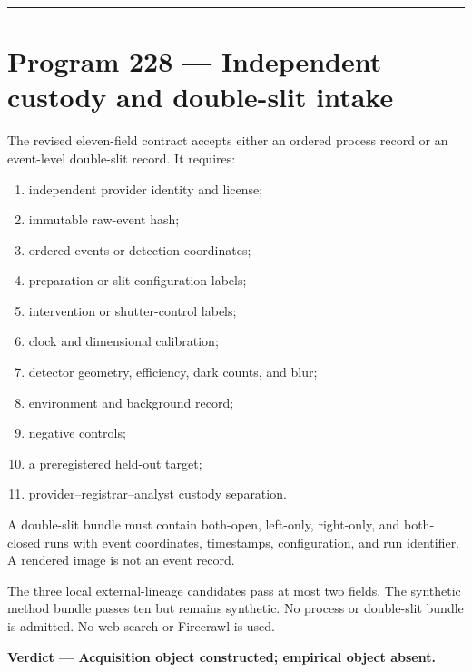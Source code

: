 \documentclass[11pt,a4paper,openany]{report}
\begin{document}
\par\medskip\hrule\medskip

\chapter{Program 228 --- Independent custody and double-slit intake}

The revised eleven-field contract accepts either an ordered process record or an event-level double-slit record. It requires:

\begin{enumerate}
\item 
independent provider identity and license;

\item 
immutable raw-event hash;

\item 
ordered events or detection coordinates;

\item 
preparation or slit-configuration labels;

\item 
intervention or shutter-control labels;

\item 
clock and dimensional calibration;

\item 
detector geometry, efficiency, dark counts, and blur;

\item 
environment and background record;

\item 
negative controls;

\item 
a preregistered held-out target;

\item 
provider--registrar--analyst custody separation.

\end{enumerate}

A double-slit bundle must contain both-open, left-only, right-only, and both-closed runs with event coordinates, timestamps, configuration, and run identifier. A rendered image is not an event record.

The three local external-lineage candidates pass at most two fields. The synthetic method bundle passes ten but remains synthetic. No process or double-slit bundle is admitted. No web search or Firecrawl is used.

\textbf{Verdict --- Acquisition object constructed; empirical object absent.}
\end{document}
